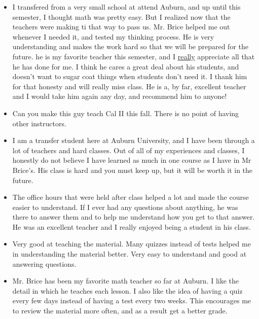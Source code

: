 \documentclass[11pt]{article}
\begin{document}
	
	\begin{itemize}
	
		\item{} I transfered from a very small school at attend Auburn, and up until this semester, I thought math was pretty easy. But I realized now that the teachers were making ti that way to pass us. Mr. Brice helped me out whenever I needed it, and tested my thinking process. He is very understanding and makes the work hard so that we will be prepared for the future. he is my favorite teacher this semester, and I \underline{really} appreciate all that he has done for me. I think he cares a great deal about his students, and doesn't want to sugar coat things when students don't need it. I thank him for that honesty and will really miss class. He is a, by far, excellent teacher and I would take him again any day, and recommend him to anyone!
		
		\item{} Can you make this guy teach Cal II this fall. There is no point of having other instructors.
		
		\item{} I am a transfer student here at Auburn University, and I have been through a lot of teachers and hard classes. Out of all of my experiences and classes, I honestly do not believe I have learned as much in one course as I have in Mr Brice's. His class is hard and you must keep up, but it will be worth it in the future.
	\end{itemize}
	
	\begin{itemize}
	
		\item{} The office hours that were held after class helped a lot and made the course easier to understand. If I ever had any questions about anything, he was there to answer them and to help me understand how you get to that answer. He was an excellent teacher and I really enjoyed being a student in his class.
		
		\item{} Very good at teaching the material. Many quizzes instead of tests helped me in understanding the material better. Very easy to understand and good at answering questions.
		
		\item{} Mr. Brice has been my favorite math teacher so far at Auburn. I like the detail in which he teaches each lesson. I also like the idea of having a quiz every few days instead of having a test every two weeks. This encourages me to review the material more often, and as a result get a better grade.
	\end{itemize}
	
\end{document}
